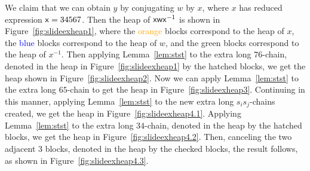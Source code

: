 \begin{example}
    We claim that we can obtain $y$ by conjugating $w$ by $x$, where $x$ has reduced expression $\mathsf{x} = 34567$.
    Then the heap of ${\mathsf{x}}{\mathsf{w}}{\mathsf{x}^{-1}}$ is shown in Figure~\ref{fig:slideexheap1}, where the \textcolor{orange}{orange} blocks correspond to the heap of $x$, the \textcolor{blue}{blue} blocks correspond to the heap of $w$, and the \textcolor{ggreen}{green} blocks correspond to the heap of $x^{-1}$.
    Then applying Lemma~\ref{lem:stst} to the extra long $76$-chain, denoted in the heap in Figure~\ref{fig:slideexheap1} by the hatched blocks, we get the heap shown in Figure~\ref{fig:slideexheap2}.
    Now we can apply Lemma~\ref{lem:stst} to the extra long $65$-chain to get the heap in Figure~\ref{fig:slideexheap3}.
    Continuing in this manner, applying Lemma~\ref{lem:stst} to the new extra long $s_is_j$-chains created, we get the heap in Figure~\ref{fig:slideexheap4.1}.
    Applying Lemma~\ref{lem:stst} to the extra long $34$-chain, denoted in the heap by the hatched blocks, we get the heap in Figure~\ref{fig:slideexheap4.2}.
    Then, canceling the two adjacent $3$ blocks, denoted in the heap by the checked blocks, the result follows, as shown in Figure~\ref{fig:slideexheap4.3}.
    

\end{example}
